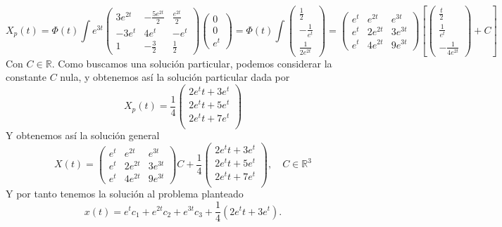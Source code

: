 \documentclass[fleqn]{article}
\def\R{\mathds{R}}
\begin{document}
    $$
    X_p(t) = \Phi(t) \int e^{3t}
    \begin{pmatrix}
        3e^{2t} & -\frac{5e^{2t}}{2} & \frac{e^{2t}}{2} \\
        -3e^t & 4e^t & -e^t \\
        1 & -\frac{3}{2} & \frac{1}{2}
    \end{pmatrix}
    \begin{pmatrix}
        0 \\ 0 \\ e^t
    \end{pmatrix}
    = \Phi(t) \int
    \begin{pmatrix}
        \frac{1}{2} \\ -\frac{1}{e^t} \\ \frac{1}{2e^{2t}}
    \end{pmatrix}
    = 
    \begin{pmatrix}
        e^t & e^{2t} & e^{3t} \\
        e^t & 2e^{2t} & 3e^{3t} \\ 
        e^t & 4e^{2t} & 9e^{3t}
    \end{pmatrix}\left[
    \begin{pmatrix}
        \frac{t}{2} \\ \frac{1}{e^t} \\ -\frac{1}{4e^{2t}}
    \end{pmatrix}
    +C
    \right]
    $$
    Con $C\in\R$. Como buscamos una solución particular, podemos considerar la constante $C$ nula, y obtenemos así la solución particular dada por 
    $$X_p(t)=\frac{1}{4}
    \begin{pmatrix}
        2e^{t}t + 3e^t \\
        2e^{t}t + 5e^t \\
        2e^{t}t + 7e^t \\
    \end{pmatrix}
    $$
    Y obtenemos así la solución general
    $$X(t) = 
    \begin{pmatrix}
        e^t & e^{2t} & e^{3t} \\
        e^t & 2e^{2t} & 3e^{3t} \\ 
        e^t & 4e^{2t} & 9e^{3t}
    \end{pmatrix}C
    + \frac{1}{4}
    \begin{pmatrix}
        2e^{t}t + 3e^t \\
        2e^{t}t + 5e^t \\
        2e^{t}t + 7e^t \\
    \end{pmatrix}
    , \quad C\in\R^3
    $$
    Y por tanto tenemos la solución al problema planteado
    $$x(t) = e^tc_1 + e^{2t}c_2 + e^{3t}c_3 + \frac{1}{4}(2e^{t}t + 3e^t). $$
\end{document}
